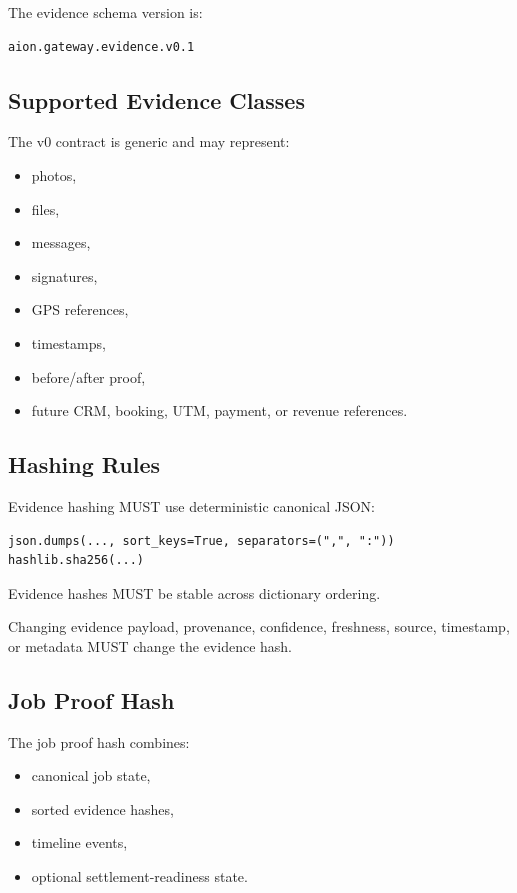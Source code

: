 The evidence schema version is:

\begin{verbatim}
aion.gateway.evidence.v0.1
\end{verbatim}

\subsection{Supported Evidence Classes}

The v0 contract is generic and may represent:

\begin{itemize}
  \item photos,
  \item files,
  \item messages,
  \item signatures,
  \item GPS references,
  \item timestamps,
  \item before/after proof,
  \item future CRM, booking, UTM, payment, or revenue references.
\end{itemize}

\subsection{Hashing Rules}

Evidence hashing MUST use deterministic canonical JSON:

\begin{verbatim}
json.dumps(..., sort_keys=True, separators=(",", ":"))
hashlib.sha256(...)
\end{verbatim}

Evidence hashes MUST be stable across dictionary ordering.

Changing evidence payload, provenance, confidence, freshness, source, timestamp, or metadata MUST change the evidence hash.

\subsection{Job Proof Hash}

The job proof hash combines:

\begin{itemize}
  \item canonical job state,
  \item sorted evidence hashes,
  \item timeline events,
  \item optional settlement-readiness state.
\end{itemize}

